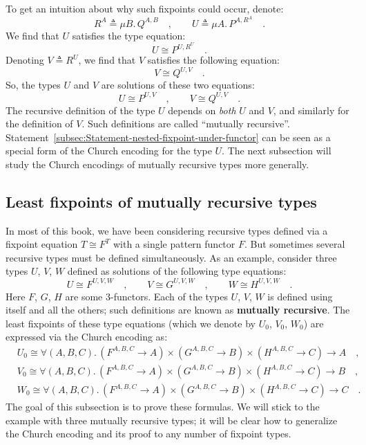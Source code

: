 To get an intuition about why such fixpoints could occur, denote:
\[
R^{A}\triangleq\mu B.\,Q^{A,B}\quad,\quad\quad U\triangleq\mu A.\,P^{A,R^{A}}\quad.
\]
We find that $U$ satisfies the type equation:
\[
U\cong P^{U,R^{U}}\quad.
\]
Denoting $V\triangleq R^{U}$, we find that $V$ satisfies the following
equation:
\[
V\cong Q^{U,V}\quad.
\]
So, the types $U$ and $V$ are solutions of these two equations:
\[
U\cong P^{U,V}\quad,\quad\quad V\cong Q^{U,V}\quad.
\]
The recursive definition of the type $U$ depends on \emph{both} $U$
and $V$, and similarly for the definition of $V$. Such definitions
are called \textsf{``}mutually recursive\textsf{''}. Statement~\ref{subsec:Statement-nested-fixpoint-under-functor}
can be seen as a special form of the Church encoding for the type
$U$. The next subsection will study the Church encodings of mutually
recursive types more generally.

\subsection{Least fixpoints of mutually recursive types\label{subsec:Least-fixpoints-of-mutually-recursive-types}}

In most of this book, we have been considering recursive types defined
via a fixpoint equation $T\cong F^{T}$ with a single pattern functor
$F$. But sometimes several recursive types must be defined simultaneously.
As an example, consider three types $U$, $V$, $W$ defined as solutions
of the following type equations:
\[
U\cong F^{U,V,W}\quad,\quad\quad V\cong G^{U,V,W}\quad,\quad\quad W\cong H^{U,V,W}\quad.
\]
Here $F$, $G$, $H$ are some $3$-functors. Each of the types $U$,
$V$, $W$ is defined using itself and all the others; such definitions
are known as \textbf{mutually recursive}.
The least fixpoints of these type equations (which we denote by $U_{0}$,
$V_{0}$, $W_{0}$) are expressed via the Church encoding as:
\begin{align*}
 & U_{0}\cong\forall(A,B,C).\,(F^{A,B,C}\rightarrow A)\times(G^{A,B,C}\rightarrow B)\times(H^{A,B,C}\rightarrow C)\rightarrow A\quad,\\
 & V_{0}\cong\forall(A,B,C).\,(F^{A,B,C}\rightarrow A)\times(G^{A,B,C}\rightarrow B)\times(H^{A,B,C}\rightarrow C)\rightarrow B\quad,\\
 & W_{0}\cong\forall(A,B,C).\,(F^{A,B,C}\rightarrow A)\times(G^{A,B,C}\rightarrow B)\times(H^{A,B,C}\rightarrow C)\rightarrow C\quad.
\end{align*}
The goal of this subsection is to prove these formulas. We will stick
to the example with three mutually recursive types; it will be clear
how to generalize the Church encoding and its proof to any number
of fixpoint types.

